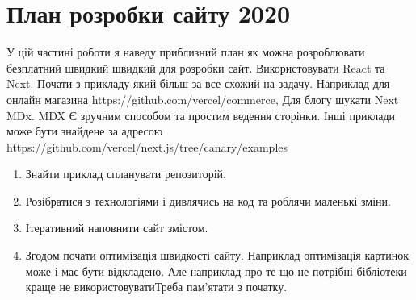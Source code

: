 \newpage
\section{План розробки сайту 2020}
У цій частині роботи я наведу приблизний план як можна розроблювати безплатний швидкий швидкий для розробки сайт.
Використовувати React та Next.
Почати з прикладу який більш за все схожий на задачу.
Наприклад для онлайн магазина https://github.com/vercel/commerce,
Для блогу шукати Next MDx. MDX Є зручним способом та простим ведення сторінки.
Інші приклади може бути знайдене за адресою https://github.com/vercel/next.js/tree/canary/examples

\begin{enumerate}
    \item Знайти приклад спланувати репозиторій.
    \item Розібратися з технологіями і дивлячись на код та роблячи маленькі зміни.
    \item Ітеративний наповнити сайт змістом.
    \item Згодом почати оптимізація швидкості сайту. Наприклад оптимізація картинок може і має бути відкладено. Але наприклад про те що не потрібні бібліотеки краще не використовуватиТреба пам'ятати з початку.
\end{enumerate}
